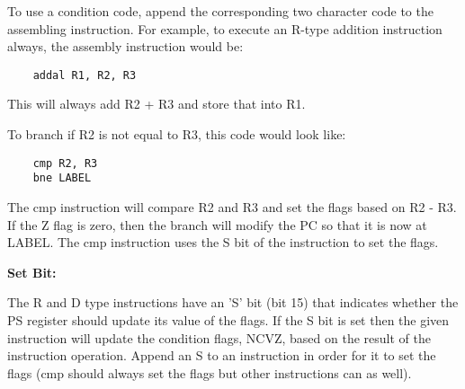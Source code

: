 \documentclass[]{article}
\begin{document}
\noindent To use a condition code, append the corresponding two character code to the assembling instruction.  For example, to execute an R-type addition instruction always, the assembly instruction would be:
\begin{lstlisting}
	addal R1, R2, R3
\end{lstlisting}
\noindent This will always add R2 + R3 and store that into R1.
\newline

\noindent To branch if R2 is not equal to R3, this code would look like:
\begin{lstlisting}
	cmp R2, R3
	bne LABEL
\end{lstlisting}
\noindent The cmp instruction will compare R2 and R3 and set the flags based on R2 - R3.  If the Z flag is zero, then the branch will modify the PC so that it is now at LABEL.  The cmp instruction uses the S bit of the instruction to set the flags.
\newline\newline

{\Large
	\textbf{
		Set Bit:
	}
}

\noindent The R and D type instructions have an 'S' bit (bit 15) that indicates whether the PS register should update its value of the flags.  If the S bit is set then the given instruction will update the condition flags, NCVZ, based on the result of the instruction operation.  Append an S to an instruction in order for it to set the flags (cmp should always set the flags but other instructions can as well).

\pagebreak
\end{document}

